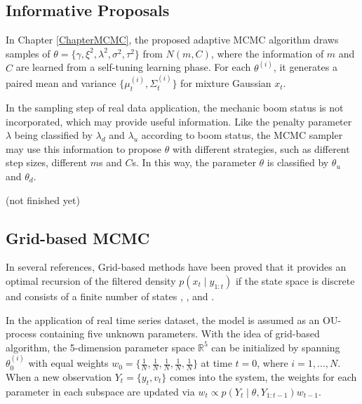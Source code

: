 \subsection*{Informative Proposals}

In Chapter \ref{ChapterMCMC}, the proposed adaptive MCMC algorithm draws samples of $\theta=\{\gamma,\xi^2,\lambda^2,\sigma^2,\tau^2\}$ from $N(m,C)$, where the information of $m$ and $C$ are learned from a self-tuning learning phase. For each $\theta^{(i)}$, it generates a paired mean and variance $\{\mu_t^{(i)},\Sigma_t^{(i)}\}$ for mixture Gaussian $x_t$. 

In the sampling step of real data application, the mechanic boom status is not incorporated, which may provide useful information. Like the penalty parameter $\lambda$ being classified by $\lambda_d$ and $\lambda_u$ according to boom status, the MCMC sampler may use this information to propose $\theta$ with different strategies, such as different step sizes, different $m$s and $C$s. In this way, the parameter $\theta$ is classified by $\theta_u$ and $\theta_d$. 

(not finished yet)



\subsection*{Grid-based MCMC}

In several references, Grid-based methods have been proved that it provides an optimal recursion of the filtered density $p(x_t\mid y_{1:t})$ if the state space is discrete and consists of a finite number of states \cite{ristic2004beyond}, \cite{stroud2016bayesian}, \cite{arulampalam2002tutorial} and \cite{hartmann2016grid}. 

In the application of real time series dataset, the model is assumed as an OU-process containing five unknown parameters. With the idea of grid-based algorithm, the 5-dimension parameter space $\mathbb{R}^5$ can be initialized by spanning $\theta_0^{(i)}$ with equal weights $w_0=\{\frac{1}{N},\frac{1}{N},\frac{1}{N},\frac{1}{N},\frac{1}{N}\}$ at time $t=0$, where $i=1,\ldots,N$. When a new observation $Y_t=\{y_t,v_t\}$ comes into the system, the weights for each parameter in each subspace are updated via $w_t\propto p(Y_t\mid \theta,Y_{1:t-1})w_{t-1}$. 

